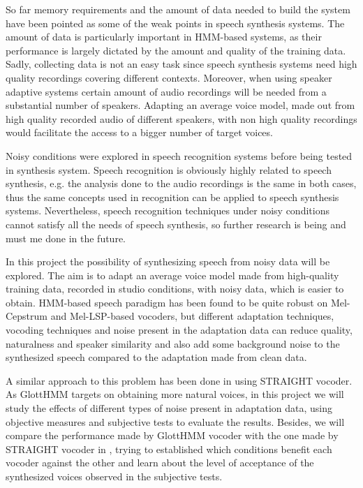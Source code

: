 So far memory requirements and the amount of data needed to build the system have been pointed as some of the weak points in speech synthesis systems. The amount of data is particularly important in HMM-based systems, as their performance is largely dictated by the amount and quality of the training data. Sadly, collecting data is not an easy task since speech synthesis systems need high quality recordings covering different contexts. Moreover, when using speaker adaptive systems certain amount of audio recordings will be needed from a substantial number of speakers. Adapting an average voice model, made out from high quality recorded audio of different speakers, with non high quality recordings would facilitate the access to a bigger number of target voices.

Noisy conditions were explored in speech recognition systems before being tested in synthesis system. Speech recognition is obviously highly related to speech synthesis, e.g. the analysis done to the audio recordings is the same in both cases, thus the same concepts used in recognition can be applied to speech synthesis systems. Nevertheless, speech recognition techniques under noisy conditions cannot satisfy all the needs of speech synthesis, so further research is being and must me done in the future.

In this project the possibility of synthesizing speech from noisy data will be explored. The aim is to adapt an average voice model made from high-quality training data, recorded in studio conditions, with noisy data, which is easier to obtain. HMM-based speech paradigm has been found to be quite robust on Mel-Cepstrum \cite{karhila_remes_icassp13, yamagishi2008robustness} and Mel-LSP-based vocoders, but different adaptation techniques, vocoding techniques and noise present in the adaptation data can reduce quality, naturalness and speaker similarity and also add some background noise to the synthesized speech compared to the adaptation made from clean data. 

A similar approach to this problem has been done in \cite{karhila_remes_icassp13} using STRAIGHT vocoder. As GlottHMM targets on obtaining more natural voices, in this project we will study the effects of different types of noise present in adaptation data, using objective measures and subjective tests to evaluate the results. Besides, we will compare the performance made by GlottHMM vocoder with the one made by STRAIGHT vocoder in \cite{karhila_remes_icassp13}, trying to established which conditions benefit each vocoder against the other and learn about the level of acceptance of the synthesized voices observed in the subjective tests.    